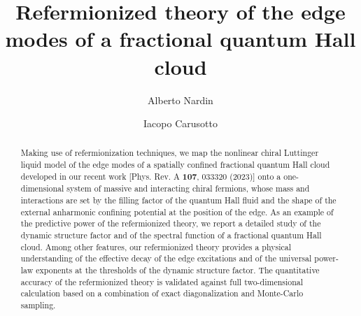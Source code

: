 \documentclass[twocolumn,pra,superscriptaddress,noshowpacs]{revtex4}
\newcommand{\addition}[1]{\textcolor{blue}{#1}}
\begin{document}
\title{Refermionized theory of the edge modes of a fractional quantum Hall cloud}
\author{Alberto Nardin}
\author{Iacopo Carusotto}

\begin{abstract}
Making use of refermionization techniques, we map the nonlinear chiral Luttinger liquid model of the edge modes of a spatially confined fractional quantum Hall cloud developed in our recent work [Phys. Rev. A {\bf 107}, 033320 (2023)] onto a one-dimensional system of massive and interacting chiral fermions, whose mass and interactions are set by the filling factor of the quantum Hall fluid and the shape of the external anharmonic confining potential at the position of the edge.
As an example of the predictive power of the refermionized theory, we report a detailed study of the dynamic structure factor and of the spectral function of a fractional quantum Hall cloud. 
Among other features, our refermionized theory provides a physical understanding of the effective decay of the edge excitations and of the universal power-law exponents at the thresholds of the dynamic structure factor.
The quantitative accuracy of the refermionized theory is validated against full two-dimensional calculation based on a combination of exact diagonalization and
Monte-Carlo sampling.

\end{abstract}

\maketitle
\end{document}
